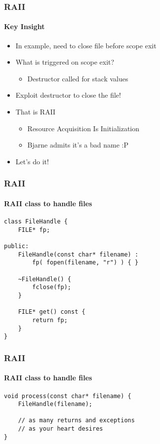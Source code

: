 \begin{frame}
    \frametitle{RAII}
    \framesubtitle{Key Insight}
    \begin{itemize}
        \item In example, need to close file before scope exit
        \item What is triggered on scope exit?
            \begin{itemize}
                \item Destructor called for stack values
            \end{itemize}
        \item Exploit destructor to close the file!
        \item That is RAII
            \begin{itemize}
                \item Resource Acquisition Is Initialization
                \item Bjarne admits it's a bad name :P
            \end{itemize}
        \item Let's do it!
    \end{itemize}
\end{frame}

\begin{frame}[fragile]
    \frametitle{RAII}
    \framesubtitle{RAII class to handle files}
    \begin{lstlisting}[title=Problems begone!]
class FileHandle {
    FILE* fp;

public:
    FileHandle(const char* filename) :
        fp( fopen(filename, "r") ) { }

    ~FileHandle() {
        fclose(fp);
    }

    FILE* get() const {
        return fp;
    }
}
    \end{lstlisting}
\end{frame}

\begin{frame}[fragile]
    \frametitle{RAII}
    \framesubtitle{RAII class to handle files}
    \begin{lstlisting}[title=Problems begone!]
void process(const char* filename) {
    FileHandle(filename);

    // as many returns and exceptions
    // as your heart desires
}
    \end{lstlisting}
\end{frame}

